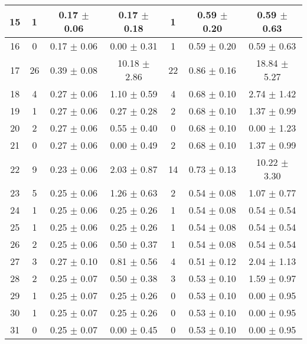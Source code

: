 \begin{table}[h!]
\begin{tabular}{c|c|c|c|c|c|c}
15 & 1  & 0.17  $\pm$  0.06  & 0.17 $\pm$ 0.18 & 1  & 0.59  $\pm$  0.20  & 0.59 $\pm$ 0.63    \\\hline
16 & 0  & 0.17  $\pm$  0.06  & 0.00 $\pm$ 0.31 & 1  & 0.59  $\pm$  0.20  & 0.59 $\pm$ 0.63    \\\hline
17 & 26  & 0.39  $\pm$  0.08  & 10.18 $\pm$ 2.86 & 22  & 0.86  $\pm$  0.16  & 18.84 $\pm$ 5.27    \\\hline
18 & 4  & 0.27  $\pm$  0.06  & 1.10 $\pm$ 0.59 & 4  & 0.68  $\pm$  0.10  & 2.74 $\pm$ 1.42    \\\hline
19 & 1  & 0.27  $\pm$  0.06  & 0.27 $\pm$ 0.28 & 2  & 0.68  $\pm$  0.10  & 1.37 $\pm$ 0.99    \\\hline
20 & 2  & 0.27  $\pm$  0.06  & 0.55 $\pm$ 0.40 & 0  & 0.68  $\pm$  0.10  & 0.00 $\pm$ 1.23    \\\hline
21 & 0  & 0.27  $\pm$  0.06  & 0.00 $\pm$ 0.49 & 2  & 0.68  $\pm$  0.10  & 1.37 $\pm$ 0.99    \\\hline
22 & 9  & 0.23  $\pm$  0.06  & 2.03 $\pm$ 0.87 & 14  & 0.73  $\pm$  0.13  & 10.22 $\pm$ 3.30    \\\hline
23 & 5  & 0.25  $\pm$  0.06  & 1.26 $\pm$ 0.63 & 2  & 0.54  $\pm$  0.08  & 1.07 $\pm$ 0.77    \\\hline
24 & 1  & 0.25  $\pm$  0.06  & 0.25 $\pm$ 0.26 & 1  & 0.54  $\pm$  0.08  & 0.54 $\pm$ 0.54    \\\hline
25 & 1  & 0.25  $\pm$  0.06  & 0.25 $\pm$ 0.26 & 1  & 0.54  $\pm$  0.08  & 0.54 $\pm$ 0.54    \\\hline
26 & 2  & 0.25  $\pm$  0.06  & 0.50 $\pm$ 0.37 & 1  & 0.54  $\pm$  0.08  & 0.54 $\pm$ 0.54    \\\hline
27 & 3  & 0.27  $\pm$  0.10  & 0.81 $\pm$ 0.56 & 4  & 0.51  $\pm$  0.12  & 2.04 $\pm$ 1.13    \\\hline
28 & 2  & 0.25  $\pm$  0.07  & 0.50 $\pm$ 0.38 & 3  & 0.53  $\pm$  0.10  & 1.59 $\pm$ 0.97    \\\hline
29 & 1  & 0.25  $\pm$  0.07  & 0.25 $\pm$ 0.26 & 0  & 0.53  $\pm$  0.10  & 0.00 $\pm$ 0.95    \\\hline
30 & 1  & 0.25  $\pm$  0.07  & 0.25 $\pm$ 0.26 & 0  & 0.53  $\pm$  0.10  & 0.00 $\pm$ 0.95    \\\hline
31 & 0  & 0.25  $\pm$  0.07  & 0.00 $\pm$ 0.45 & 0  & 0.53  $\pm$  0.10  & 0.00 $\pm$ 0.95    \\\hline
\end{tabular}
\end{table}

